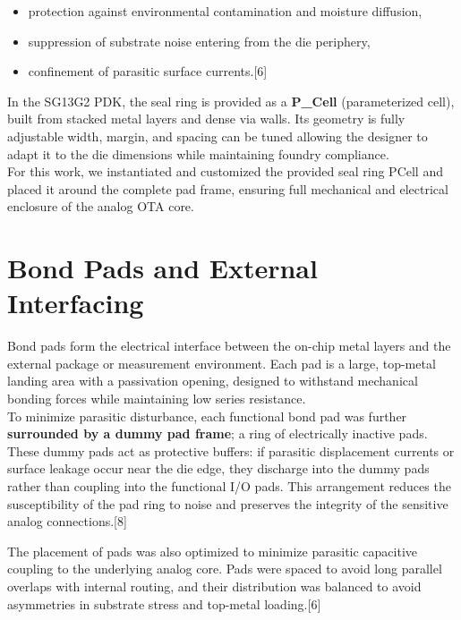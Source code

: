\documentclass[
  11pt,
  a4paper,
  oneside]{scrbook}
\providecommand{\tightlist}{%
  \setlength{\itemsep}{0pt}\setlength{\parskip}{0pt}}
\begin{document}
\begin{itemize}
\tightlist
\item
  protection against environmental contamination and moisture
  diffusion,\\
\item
  suppression of substrate noise entering from the die periphery,\\
\item
  confinement of parasitic surface currents.{[}6{]}
\end{itemize}

In the SG13G2 PDK, the seal ring is provided as a \textbf{P\_Cell}
(parameterized cell), built from stacked metal layers and dense via
walls. Its geometry is fully adjustable width, margin, and spacing can
be tuned allowing the designer to adapt it to the die dimensions while
maintaining foundry compliance.\\
For this work, we instantiated and customized the provided seal ring
PCell and placed it around the complete pad frame, ensuring full
mechanical and electrical enclosure of the analog OTA core.

\section{Bond Pads and External
Interfacing}\label{bond-pads-and-external-interfacing}

Bond pads form the electrical interface between the on-chip metal layers
and the external package or measurement environment. Each pad is a
large, top-metal landing area with a passivation opening, designed to
withstand mechanical bonding forces while maintaining low series
resistance.\\
To minimize parasitic disturbance, each functional bond pad was further
\textbf{surrounded by a dummy pad frame}; a ring of electrically
inactive pads. These dummy pads act as protective buffers: if parasitic
displacement currents or surface leakage occur near the die edge, they
discharge into the dummy pads rather than coupling into the functional
I/O pads. This arrangement reduces the susceptibility of the pad ring to
noise and preserves the integrity of the sensitive analog
connections.{[}8{]}

The placement of pads was also optimized to minimize parasitic
capacitive coupling to the underlying analog core. Pads were spaced to
avoid long parallel overlaps with internal routing, and their
distribution was balanced to avoid asymmetries in substrate stress and
top-metal loading.{[}6{]}
\end{document}
